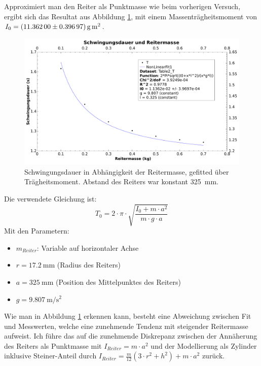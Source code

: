 \clearpage
Approximiert  man  den Reiter  als  Punktmasse  wie beim  vorherigen  Versuch,
ergibt   sich   das  Resultat   aus   Abbildung   \ref{fig:312a},  mit   einem
Massentr\"agheitsmoment von
$I_0  = \SI[separate-uncertainty = true]{11.362 \pm 0.39697}{\gram\meter\squared}$.
\begin{figure}[h!]
    \centering
    \includegraphics[width=\textwidth]{images/312.pdf}
    \caption{%
        Schwingungsdauer in Abh\"angigkeit der Reitermasse, gefitted \"uber Tr\"agheitsmoment. Abstand des Reiters war konstant \SI{325}{\milli\meter}.
    }
    \label{fig:312a}
\end{figure}

Die verwendete Gleichung ist:
\begin{equation}
    T_0 = 2 \cdot \pi \cdot \sqrt{\frac{I_0 + m \cdot a^2}{m \cdot g \cdot a}}
\end{equation}
Mit den Parametern:
\begin{itemize}
    \item
        $m_{Reiter}$: Variable auf horizontaler Achse
    \item
        $r = \SI{17.2}{\milli\meter}$ (Radius des Reiters)
    \item
        $a = \SI{325}{\milli\meter}$ (Position des Mittelpunktes des Reiters)
    \item
        $g = \SI{9.807}{\meter\per\second\squared}$
\end{itemize}

Wie man  in Abbildung  \ref{fig:312a} erkennen  kann, besteht  eine Abweichung
zwischen Fit  und Messwerten,  welche eine  zunehmende Tendenz  mit steigender
Reitermasse aufweist. Ich  f\"uhre das auf die  zunehmende Diskrepanz zwischen
der Ann\"aherung des Reiters als Punktmasse  mit $I_{Reiter} = m\cdot a^2$ und
der Modellierung als Zylinder inklusive Steiner-Anteil durch
$I_{Reiter} = \frac{m}{12}(3  \cdot r^2  + h^2) +  m \cdot a^2$ zur\"uck.


